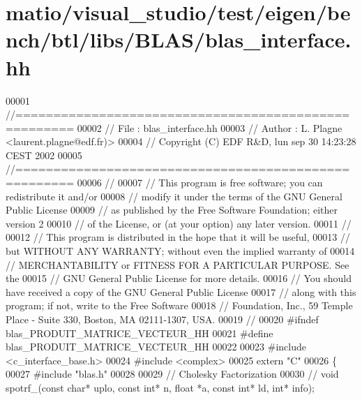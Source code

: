 \hypertarget{matio_2visual__studio_2test_2eigen_2bench_2btl_2libs_2_b_l_a_s_2blas__interface_8hh_source}{}\section{matio/visual\+\_\+studio/test/eigen/bench/btl/libs/\+B\+L\+A\+S/blas\+\_\+interface.hh}
\label{matio_2visual__studio_2test_2eigen_2bench_2btl_2libs_2_b_l_a_s_2blas__interface_8hh_source}

\begin{DoxyCode}
00001 \textcolor{comment}{//=====================================================}
00002 \textcolor{comment}{// File   :  blas\_interface.hh}
00003 \textcolor{comment}{// Author :  L. Plagne <laurent.plagne@edf.fr)>}
00004 \textcolor{comment}{// Copyright (C) EDF R&D,  lun sep 30 14:23:28 CEST 2002}
00005 \textcolor{comment}{//=====================================================}
00006 \textcolor{comment}{//}
00007 \textcolor{comment}{// This program is free software; you can redistribute it and/or}
00008 \textcolor{comment}{// modify it under the terms of the GNU General Public License}
00009 \textcolor{comment}{// as published by the Free Software Foundation; either version 2}
00010 \textcolor{comment}{// of the License, or (at your option) any later version.}
00011 \textcolor{comment}{//}
00012 \textcolor{comment}{// This program is distributed in the hope that it will be useful,}
00013 \textcolor{comment}{// but WITHOUT ANY WARRANTY; without even the implied warranty of}
00014 \textcolor{comment}{// MERCHANTABILITY or FITNESS FOR A PARTICULAR PURPOSE.  See the}
00015 \textcolor{comment}{// GNU General Public License for more details.}
00016 \textcolor{comment}{// You should have received a copy of the GNU General Public License}
00017 \textcolor{comment}{// along with this program; if not, write to the Free Software}
00018 \textcolor{comment}{// Foundation, Inc., 59 Temple Place - Suite 330, Boston, MA  02111-1307, USA.}
00019 \textcolor{comment}{//}
00020 \textcolor{preprocessor}{#ifndef blas\_PRODUIT\_MATRICE\_VECTEUR\_HH}
00021 \textcolor{preprocessor}{#define blas\_PRODUIT\_MATRICE\_VECTEUR\_HH}
00022 
00023 \textcolor{preprocessor}{#include <c\_interface\_base.h>}
00024 \textcolor{preprocessor}{#include <complex>}
00025 \textcolor{keyword}{extern} \textcolor{stringliteral}{"C"}
00026 \{
00027 \textcolor{preprocessor}{#include "blas.h"}
00028 
00029   \textcolor{comment}{// Cholesky Factorization}
00030 \textcolor{comment}{//   void spotrf\_(const char* uplo, const int* n, float *a, const int* ld, int* info);}

\end{DoxyCode}
